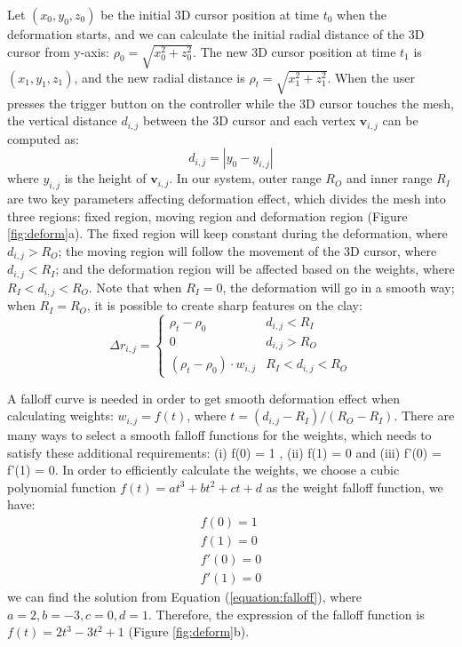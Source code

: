 \documentclass{svjour3}                     %
\begin{document}
Let $(x_{0},y_{0},z_{0})$ be the initial 3D cursor position at time $t_{0}$ when the deformation starts, and we can calculate the initial radial distance of the 3D cursor from y-axis: $\rho_{0} = \sqrt{x_{0}^2 + z_{0}^2}$. The new 3D cursor position at time $t_{1}$ is $(x_{1},y_{1},z_{1})$, and the new radial distance is $\rho_{t} = \sqrt{x_{1}^2 + z_{1}^2}$.
When the user presses the trigger button on the controller while the 3D cursor touches the mesh, the vertical distance $d_{i,j}$ between the 3D cursor and each vertex $\mathbf{v}_{i,j}$ can be computed as:
\begin{equation}
d_{i,j} = |y_{0} - y_{i,j}|
\end{equation}
where $y_{i,j}$ is the height of $\mathbf{v}_{i,j}$.
In our system, outer range $R_{O}$ and inner range $R_{I}$ are two key parameters affecting deformation effect, which divides the mesh into three regions: fixed region, moving region and deformation region (Figure \ref{fig:deform}a).
The fixed region will keep constant during the deformation, where $d_{i,j} > R_{O}$; the moving region will follow the movement of the 3D cursor, where $d_{i,j} < R_{I}$; and the deformation region will be affected based on the weights, where $R_{I} < d_{i,j} < R_{O}$.
Note that when $R_{I} = 0$, the deformation will go in a smooth way; when $R_{I} = R_{O}$, it is possible to create sharp features on the clay:
\begin{equation}
\Delta r_{i,j} = \begin{cases}
\rho_{t} - \rho_{0} &  d_{i,j} < R_{I} \\
0 &  d_{i,j} > R_{O} \\
(\rho_{t} - \rho_{0}) \cdot w_{i,j} &  R_{I} < d_{i,j} < R_{O}
\end{cases}
\end{equation}

A falloff curve is needed in order to get smooth deformation effect when calculating weights: $w_{i,j} = f(t)$, where $t = (d_{i,j} - R_{I}) / (R_{O} - R_{I})$.
There are many ways to select a smooth falloff functions for the weights, which needs to satisfy these additional requirements: (i) f(0) = 1 , (ii) f(1) = 0 and (iii) f'(0) = f'(1) = 0.
In order to efficiently calculate the weights, we choose a cubic polynomial function $f(t) = at^3 + bt^2 + ct + d$ as the weight falloff function, we have:
\begin{equation}
\begin{aligned}
\label{equation:falloff}
f(0) = 1 \\
f(1) = 0 \\ 
f'(0) = 0 \\
f'(1) = 0
\end{aligned}
\end{equation}
we can find the solution from Equation (\ref{equation:falloff}), where 
$a = 2, b = -3, c = 0, d = 1$. Therefore, the expression of the falloff function is $f(t) = 2t^3 - 3t^2 + 1$ (Figure \ref{fig:deform}b).
\end{document}
